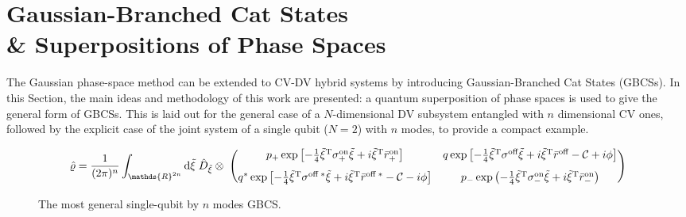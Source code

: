 \documentclass[%
reprint,
superscriptaddress,
nofootinbib,
 amsmath,amssymb,
prx,
floatfix,
]{revtex4-2}
\begin{document}
\section{ Gaussian-Branched Cat States \\ \& Superpositions of Phase Spaces \label{sec:sup_phase_space}}


The Gaussian phase-space method can be extended to CV-DV hybrid systems by introducing Gaussian-Branched Cat States (GBCSs). In this Section, the main ideas and methodology of this work are presented:  a quantum superposition of phase spaces is used to give the general form of GBCSs. This is laid out for the general case of a $N$-dimensional DV subsystem entangled with $n$ dimensional CV ones, followed by the explicit case of the joint system of a single qubit ($N = 2$) with $n$ modes, to provide a compact example. 

\begin{figure}[t]
\begin{equation}
\label{eq:density_one_qubit}
    \hat{\varrho} = \frac{1}{(2 \pi)^n} \int_{\mathds{R}^{2n}} \text{d} \tilde{\xi} \;  \hat{D}_{\tilde{\xi}} \otimes \; \begin{pmatrix}
         p_+ \exp \left[-\frac{1}{4} \tilde{\xi}^{\rm T} \sigma^{\text{on}}_+  \tilde{\xi}  +  i  \tilde{\xi}^{\rm T} \bar{r}^{\text{on}}_+   \right] & q  \exp \left[ -\frac{1}{4} \tilde{\xi}^{\rm T} \sigma^{\text{off}}  \tilde{\xi}  +  i  \tilde{\xi}^{\rm T} \bar{r}^{\text{off}}  -   \mathcal{C}  + i  \phi  \right]   \\[8pt]
       q^* \exp \left[ -\frac{1}{4} \tilde{\xi}^{\rm T} \sigma^{\text{off}\;*}  \tilde{\xi}  +  i  \tilde{\xi}^{\rm T} \bar{r}^{\text{off}\;*}  -   \mathcal{C}  - i  \phi  \right]    & p_- \exp \left(-\frac{1}{4} \tilde{\xi}^{\rm T} \sigma^{\text{on}}_-  \tilde{\xi}  +  i  \tilde{\xi}^{\rm T} \bar{r}^{\text{on}}_-   \right) 
       \end{pmatrix}
\end{equation}\caption*{The most general single-qubit by $n$ modes GBCS.\label{fig:density_one_qubit}}
\end{figure}
\end{document}
